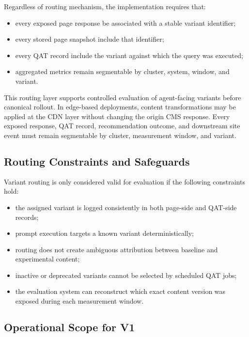 \documentclass{article}
\begin{document}
Regardless of routing mechanism, the implementation requires that:
\begin{itemize}
    \item every exposed page response be associated with a stable variant identifier;
    \item every stored page snapshot include that identifier;
    \item every QAT record include the variant against which the query was executed;
    \item aggregated metrics remain segmentable by cluster, system, window, and variant.
\end{itemize}

This routing layer supports controlled evaluation of agent-facing variants before canonical rollout. In edge-based deployments, content transformations may be applied at the CDN layer without changing the origin CMS response. Every exposed response, QAT record, recommendation outcome, and downstream site event must remain segmentable by cluster, measurement window, and variant.

\subsection{Routing Constraints and Safeguards}

Variant routing is only considered valid for evaluation if the following constraints hold:
\begin{itemize}
    \item the assigned variant is logged consistently in both page-side and QAT-side records;
    \item prompt execution targets a known variant deterministically;
    \item routing does not create ambiguous attribution between baseline and experimental content;
    \item inactive or deprecated variants cannot be selected by scheduled QAT jobs;
    \item the evaluation system can reconstruct which exact content version was exposed during each measurement window.
\end{itemize}

\subsection{Operational Scope for V1}
\end{document}
